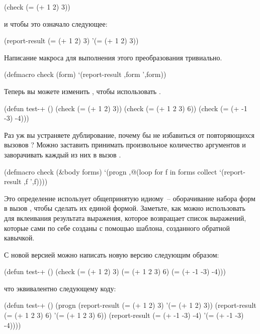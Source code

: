 \begin{myverb}
(check (= (+ 1 2) 3))
\end{myverb}

и чтобы это означало следующее:

\begin{myverb}
(report-result (= (+ 1 2) 3) '(= (+ 1 2) 3))
\end{myverb}

Написание макроса для выполнения этого преобразования тривиально.

\begin{myverb}
(defmacro check (form)
  `(report-result ,form ',form))
\end{myverb}

Теперь вы можете изменить , чтобы использовать .

\begin{myverb}
(defun test-+ ()
  (check (= (+ 1 2) 3))
  (check (= (+ 1 2 3) 6))
  (check (= (+ -1 -3) -4)))
\end{myverb}

Раз уж вы устраняете дублирование, почему бы не избавиться от повторяющихся вызовов
? Можно заставить  принимать произвольное количество аргументов и
заворачивать каждый из них в вызов .

\begin{myverb}
(defmacro check (&body forms)
  `(progn
     ,@(loop for f in forms collect `(report-result ,f ',f))))
\end{myverb}

Это определение использует общепринятую идиому~-- оборачивание набора форм в вызов
, чтобы сделать их единой формой. Заметьте, как можно использовать 
для вклеивания результата выражения, которое возвращает список выражений, которые сами по
себе созданы с помощью шаблона, созданного обратной кавычкой.

С новой версией  можно написать новую версию  следующим образом:

\begin{myverb}
(defun test-+ ()
  (check
    (= (+ 1 2) 3)
    (= (+ 1 2 3) 6)
    (= (+ -1 -3) -4)))
\end{myverb}

что эквивалентно следующему коду:

\begin{myverb}
(defun test-+ ()
  (progn
    (report-result (= (+ 1 2) 3) '(= (+ 1 2) 3))
    (report-result (= (+ 1 2 3) 6) '(= (+ 1 2 3) 6))
    (report-result (= (+ -1 -3) -4) '(= (+ -1 -3) -4))))
\end{myverb}


